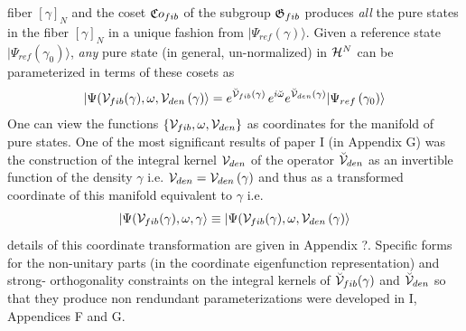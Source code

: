 fiber $\left[ \gamma \right] _{N}$ and the coset ${\frak Co}_{fib}$ of the
subgroup ${\frak G}_{fib}$ produces {\em all }the pure states in the fiber $%
\left[ \gamma \right] _{N}$ in a unique fashion from $|\Psi _{ref}\left(
\gamma \right) \rangle $. Given a reference state $|\Psi _{ref}\left( \gamma
_{0}\right) \rangle $, {\em any} pure state (in general, un-normalized) in $%
{\cal H}^{N}$ can be parameterized in terms of these cosets as 
\begin{equation}
|\Psi ({\cal V}_{fib}(\gamma ),\omega ,{\cal V}_{den}\left( \gamma \right)
\rangle =e^{{\cal \breve{V}}_{fib}(\gamma )}\,e^{i\breve{\omega}}e^{{\cal 
\breve{V}}_{den}\left( \gamma \right) }|\Psi _{ref}\left( \gamma _{0}\right)
\rangle  \label{vv1omega1}
\end{equation}%
One can view the functions $\left\{ {\cal V}_{fib},\omega ,{\cal V}%
_{den}\right\} $ as coordinates for the manifold of pure states. One of the
most significant results of paper I (in Appendix G) was the construction of
the integral kernel ${\cal V}_{den}$ of the operator ${\cal \breve{V}}_{den}$
as an invertible function of the density $\gamma $ i.e. ${\cal V}_{den}=%
{\cal V}_{den}\left( \gamma \right) $ and thus as a transformed coordinate
of this manifold equivalent to $\gamma $ i.e. 
\begin{equation}
|\Psi ({\cal V}_{fib}(\gamma ),\omega ,{\cal \gamma }\rangle \equiv |\Psi (%
{\cal V}_{fib}(\gamma ),\omega ,{\cal V}_{den}\left( \gamma \right) \rangle
\end{equation}%
details of this coordinate transformation are given in Appendix ?. Specific
forms for the non-unitary parts (in the coordinate eigenfunction
representation) and strong- orthogonality constraints on the integral
kernels of ${\cal \breve{V}}_{fib}(\gamma )$ and ${\cal \breve{V}}_{den}$ so
that they produce non rendundant parameterizations were developed in I,
Appendices F and G.

